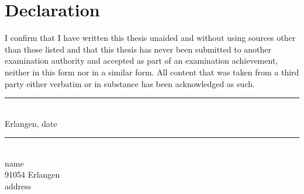 \chapter*{Declaration}
\thispagestyle{empty}

\noindent
I confirm that I have written this thesis unaided and without using sources other than those listed and that this thesis has never been submitted to another examination authority and accepted as part of an examination achievement, neither in this form nor in a similar form.
All content that was taken from a third party either verbatim or in substance has been acknowledged as such.

\vspace{3cm}

\begin{minipage}[t]{0.45\textwidth}
    \rule{\textwidth}{0.5pt}\\
	Erlangen, date
\end{minipage}
\hfill
\begin{minipage}[t]{0.45\textwidth}
	\rule{\textwidth}{0.5pt}\\
	name\\
	91054 Erlangen\\
    address \\
\end{minipage}